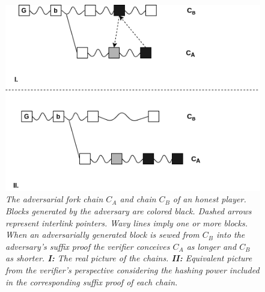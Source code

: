 \begin{figure}[h!]
	\begin{center}
		\includegraphics[scale=0.5]{figures/injection.png}
	\end{center}
	\caption{\textit{The adversarial fork chain $C_A$ and chain $C_B$ of an honest player. Blocks generated by the adversary are colored black. Dashed arrows represent interlink pointers. Wavy lines imply one or more blocks. When an adversarially generated block is sewed from $C_B$ into the adversary's suffix proof the verifier conceives $C_A$ as longer and $C_B$ as shorter.  \textbf{I:} The real picture
	 of the chains. \textbf{II:} Equivalent picture from the verifier's perspective considering the hashing power included in the corresponding suffix proof of each chain.}}
	\label{fig:injection}
\end{figure}

